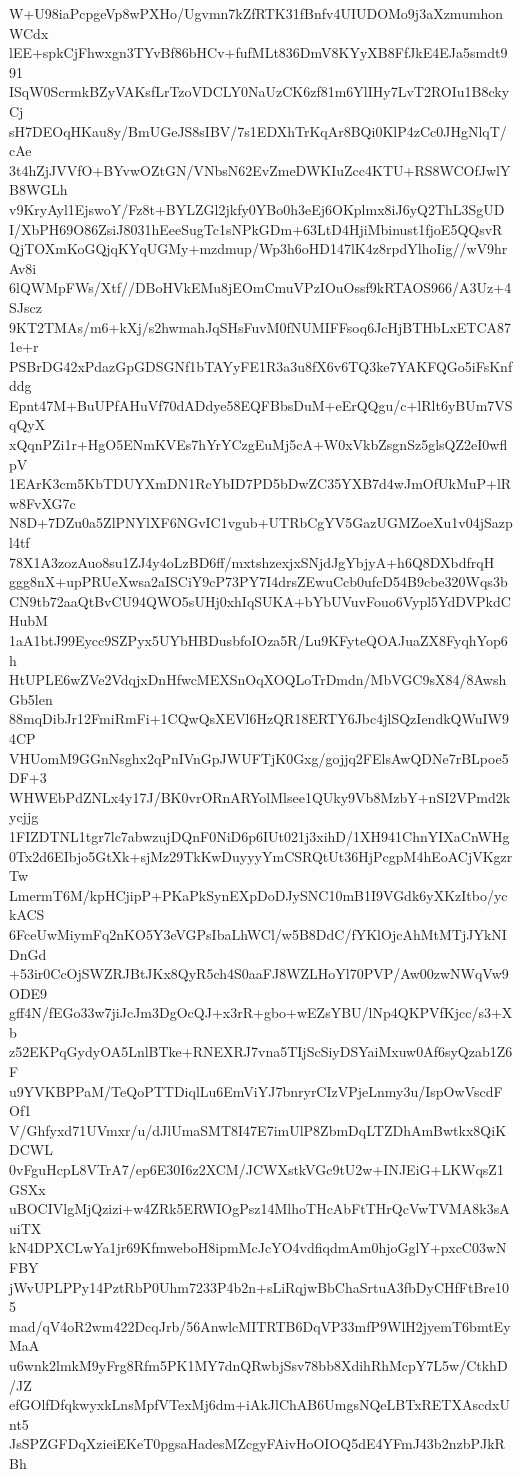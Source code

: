 W+U98iaPcpgeVp8wPXHo/Ugvmn7kZfRTK31fBnfv4UIUDOMo9j3aXzmumhonWCdx
lEE+spkCjFhwxgn3TYvBf86bHCv+fufMLt836DmV8KYyXB8FfJkE4EJa5smdt991
ISqW0ScrmkBZyVAKsfLrTzoVDCLY0NaUzCK6zf81m6YlIHy7LvT2ROIu1B8ckyCj
sH7DEOqHKau8y/BmUGeJS8sIBV/7s1EDXhTrKqAr8BQi0KlP4zCc0JHgNlqT/cAe
3t4hZjJVVfO+BYvwOZtGN/VNbsN62EvZmeDWKIuZcc4KTU+RS8WCOfJwlYB8WGLh
v9KryAyl1EjswoY/Fz8t+BYLZGl2jkfy0YBo0h3eEj6OKplmx8iJ6yQ2ThL3SgUD
I/XbPH69O86ZsiJ8031hEeeSugTc1sNPkGDm+63LtD4HjiMbinust1fjoE5QQsvR
QjTOXmKoGQjqKYqUGMy+mzdmup/Wp3h6oHD147lK4z8rpdYlhoIig//wV9hrAv8i
6lQWMpFWs/Xtf//DBoHVkEMu8jEOmCmuVPzIOuOssf9kRTAOS966/A3Uz+4SJscz
9KT2TMAs/m6+kXj/s2hwmahJqSHsFuvM0fNUMIFFsoq6JcHjBTHbLxETCA871e+r
PSBrDG42xPdazGpGDSGNf1bTAYyFE1R3a3u8fX6v6TQ3ke7YAKFQGo5iFsKnfddg
Epnt47M+BuUPfAHuVf70dADdye58EQFBbsDuM+eErQQgu/c+lRlt6yBUm7VSqQyX
xQqnPZi1r+HgO5ENmKVEs7hYrYCzgEuMj5cA+W0xVkbZsgnSz5glsQZ2eI0wflpV
1EArK3cm5KbTDUYXmDN1RcYbID7PD5bDwZC35YXB7d4wJmOfUkMuP+lRw8FvXG7c
N8D+7DZu0a5ZlPNYlXF6NGvIC1vgub+UTRbCgYV5GazUGMZoeXu1v04jSazpl4tf
78X1A3zozAuo8su1ZJ4y4oLzBD6ff/mxtshzexjxSNjdJgYbjyA+h6Q8DXbdfrqH
ggg8nX+upPRUeXwsa2aISCiY9cP73PY7I4drsZEwuCcb0ufcD54B9cbe320Wqs3b
CN9tb72aaQtBvCU94QWO5sUHj0xhIqSUKA+bYbUVuvFouo6Vypl5YdDVPkdCHubM
1aA1btJ99Eycc9SZPyx5UYbHBDusbfoIOza5R/Lu9KFyteQOAJuaZX8FyqhYop6h
HtUPLE6wZVe2VdqjxDnHfwcMEXSnOqXOQLoTrDmdn/MbVGC9sX84/8AwshGb5len
88mqDibJr12FmiRmFi+1CQwQsXEVl6HzQR18ERTY6Jbc4jlSQzIendkQWuIW94CP
VHUomM9GGnNsghx2qPnIVnGpJWUFTjK0Gxg/gojjq2FElsAwQDNe7rBLpoe5DF+3
WHWEbPdZNLx4y17J/BK0vrORnARYolMlsee1QUky9Vb8MzbY+nSI2VPmd2kycjjg
1FIZDTNL1tgr7lc7abwzujDQnF0NiD6p6IUt021j3xihD/1XH941ChnYIXaCnWHg
0Tx2d6EIbjo5GtXk+sjMz29TkKwDuyyyYmCSRQtUt36HjPcgpM4hEoACjVKgzrTw
LmermT6M/kpHCjipP+PKaPkSynEXpDoDJySNC10mB1I9VGdk6yXKzItbo/yckACS
6FceUwMiymFq2nKO5Y3eVGPsIbaLhWCl/w5B8DdC/fYKlOjcAhMtMTjJYkNIDnGd
+53ir0CcOjSWZRJBtJKx8QyR5ch4S0aaFJ8WZLHoYl70PVP/Aw00zwNWqVw9ODE9
gff4N/fEGo33w7jiJcJm3DgOcQJ+x3rR+gbo+wEZsYBU/lNp4QKPVfKjcc/s3+Xb
z52EKPqGydyOA5LnlBTke+RNEXRJ7vna5TIjScSiyDSYaiMxuw0Af6syQzab1Z6F
u9YVKBPPaM/TeQoPTTDiqlLu6EmViYJ7bnryrCIzVPjeLnmy3u/IspOwVscdFOf1
V/Ghfyxd71UVmxr/u/dJlUmaSMT8I47E7imUlP8ZbmDqLTZDhAmBwtkx8QiKDCWL
0vFguHcpL8VTrA7/ep6E30I6z2XCM/JCWXstkVGc9tU2w+INJEiG+LKWqsZ1GSXx
uBOCIVlgMjQzizi+w4ZRk5ERWIOgPsz14MlhoTHcAbFtTHrQcVwTVMA8k3sAuiTX
kN4DPXCLwYa1jr69KfmweboH8ipmMcJcYO4vdfiqdmAm0hjoGglY+pxcC03wNFBY
jWvUPLPPy14PztRbP0Uhm7233P4b2n+sLiRqjwBbChaSrtuA3fbDyCHfFtBre105
mad/qV4oR2wm422DcqJrb/56AnwlcMITRTB6DqVP33mfP9WlH2jyemT6bmtEyMaA
u6wnk2lmkM9yFrg8Rfm5PK1MY7dnQRwbjSsv78bb8XdihRhMcpY7L5w/CtkhD/JZ
efGOlfDfqkwyxkLnsMpfVTexMj6dm+iAkJlChAB6UmgsNQeLBTxRETXAscdxUnt5
JsSPZGFDqXzieiEKeT0pgsaHadesMZcgyFAivHoOIOQ5dE4YFmJ43b2nzbPJkRBh
